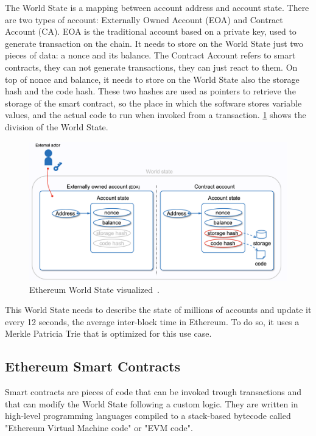 The World State is a mapping between account address and account state. There are two types of account: Externally Owned Account (EOA) and Contract Account (CA). EOA is the traditional account based on a private key, used to generate transaction on the chain. It needs to store on the World State just two pieces of data: a nonce and its balance. The Contract Account refers to smart contracts, they can not generate transactions, they can just react to them. On top of nonce and balance, it needs to store on the World State also the storage hash and the code hash. These two hashes are used as pointers to retrieve the storage of the smart contract, so the place in which the software stores variable values, and the actual code to run when invoked from a transaction. \cref{fig:ethereum-world-state} shows the division of the World State.

\begin{figure}[H]
    \centering
    \includegraphics[width=1\textwidth]{Figures/background/world-state.png}
    \caption{Ethereum World State visualized~\cite{evm-illustrated}.}
    \label{fig:ethereum-world-state}
\end{figure}

This World State needs to describe the state of millions of accounts and update it every 12 seconds, the average inter-block time in Ethereum. To do so, it uses a Merkle Patricia Trie that is optimized for this use case. 

\subsection{Ethereum Smart Contracts}

Smart contracts are pieces of code that can be invoked trough transactions and that can modify the World State following a custom logic. They are written in high-level programming languages compiled to a stack-based bytecode called "Ethereum Virtual Machine code" or "EVM code". 

